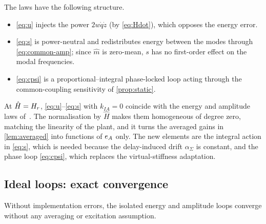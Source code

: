 The laws have the following structure.
\begin{itemize}
\item \eqref{eq:u} injects the power $2w\dot q\dot z$ (by \eqref{eq:Hdot}),
  which opposes the energy error.
\item \eqref{eq:s} is power-neutral and redistributes energy between the modes
  through \eqref{eq:common-amp}; since $\hat m$ is zero-mean, $s$ has no
  first-order effect on the modal frequencies.
\item \eqref{eq:cpsi} is a proportional--integral phase-locked loop acting
  through the common-coupling sensitivity of \cref{prop:static}.
\end{itemize}
At $\hat H=H_r$, \eqref{eq:u}--\eqref{eq:s} with $k_{IA}=0$ coincide with the energy
and amplitude laws of~\citet{juchem2027restoring}.
The normalisation by $\hat H$ makes them homogeneous of degree zero, matching
the linearity of the plant, and it turns the averaged gains in
\cref{lem:averaged} into functions of $e_A$ only.
The new elements are the integral action in \eqref{eq:s}, which is needed because
the delay-induced drift $\alpha_\Sigma$ is constant, and the phase loop
\eqref{eq:cpsi}, which replaces the virtual-stiffness adaptation.

\subsection{Ideal loops: exact convergence}
Without implementation errors, the isolated energy and amplitude loops converge
without any averaging or excitation assumption.

